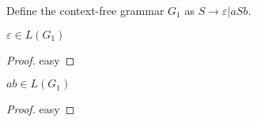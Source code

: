 \begin{definition}\label{def:mygrammar}
  \leanok
Define the context-free grammar $G_1$ as $S \to \varepsilon | a S b$.
\end{definition}

\begin{theorem}\label{thm:my_second_theorem}
  \leanok
  $\varepsilon \in L(G_1)$
\end{theorem}
\begin{proof}
  \leanok
  easy
\end{proof}

\begin{theorem}\label{thm:my_third_theorem}
  \leanok
  $ab \in L(G_1)$
\end{theorem}
\begin{proof}
  \leanok
  easy
\end{proof}
